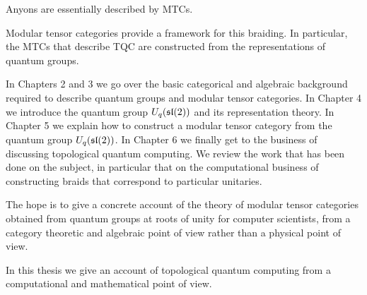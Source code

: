 Anyons are essentially described by MTCs. 



Modular tensor categories provide a framework for this braiding. In particular,
the MTCs that describe TQC are constructed from the representations of quantum groups. 

In Chapters 2 and 3 we go over the basic categorical and algebraic background
required to describe quantum groups and modular tensor categories. In Chapter 4
we introduce the quantum group $U_q(\mathfrak{sl}(2))$ and its representation theory. In
Chapter 5 we explain how to construct a modular tensor category from the
quantum group $U_q(\mathfrak{sl}(2))$. In Chapter 6 we finally get to the business of
discussing topological quantum computing. We review the work that has been done
on the subject, in particular that on the computational business of
constructing braids that correspond to particular unitaries. 

The hope is to give a concrete account of the theory of modular tensor
categories obtained from quantum groups at roots of unity for computer
scientists, from a category theoretic and algebraic point of view rather than a
physical point of view. 

In this thesis we give an account of topological quantum computing from a
computational and mathematical point of view. 
